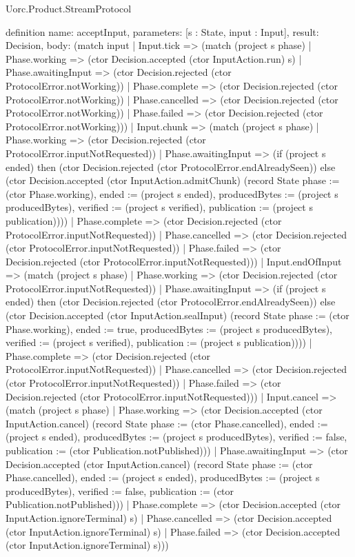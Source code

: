 \begin{lexlean}{Uorc.Product.StreamProtocol}
\begin{semanticmodule}
definition{
  name: acceptInput,
  parameters: [s : State, input : Input],
  result: Decision,
  body: (match input
    | Input.tick => (match (project s phase)
      | Phase.working => (ctor Decision.accepted (ctor InputAction.run) s)
      | Phase.awaitingInput => (ctor Decision.rejected (ctor ProtocolError.notWorking))
      | Phase.complete => (ctor Decision.rejected (ctor ProtocolError.notWorking))
      | Phase.cancelled => (ctor Decision.rejected (ctor ProtocolError.notWorking))
      | Phase.failed => (ctor Decision.rejected (ctor ProtocolError.notWorking)))
    | Input.chunk => (match (project s phase)
      | Phase.working => (ctor Decision.rejected (ctor ProtocolError.inputNotRequested))
      | Phase.awaitingInput => (if (project s ended) then (ctor Decision.rejected (ctor ProtocolError.endAlreadySeen)) else (ctor Decision.accepted (ctor InputAction.admitChunk) (record State {phase := (ctor Phase.working), ended := (project s ended), producedBytes := (project s producedBytes), verified := (project s verified), publication := (project s publication)})))
      | Phase.complete => (ctor Decision.rejected (ctor ProtocolError.inputNotRequested))
      | Phase.cancelled => (ctor Decision.rejected (ctor ProtocolError.inputNotRequested))
      | Phase.failed => (ctor Decision.rejected (ctor ProtocolError.inputNotRequested)))
    | Input.endOfInput => (match (project s phase)
      | Phase.working => (ctor Decision.rejected (ctor ProtocolError.inputNotRequested))
      | Phase.awaitingInput => (if (project s ended) then (ctor Decision.rejected (ctor ProtocolError.endAlreadySeen)) else (ctor Decision.accepted (ctor InputAction.sealInput) (record State {phase := (ctor Phase.working), ended := true, producedBytes := (project s producedBytes), verified := (project s verified), publication := (project s publication)})))
      | Phase.complete => (ctor Decision.rejected (ctor ProtocolError.inputNotRequested))
      | Phase.cancelled => (ctor Decision.rejected (ctor ProtocolError.inputNotRequested))
      | Phase.failed => (ctor Decision.rejected (ctor ProtocolError.inputNotRequested)))
    | Input.cancel => (match (project s phase)
      | Phase.working => (ctor Decision.accepted (ctor InputAction.cancel) (record State {phase := (ctor Phase.cancelled), ended := (project s ended), producedBytes := (project s producedBytes), verified := false, publication := (ctor Publication.notPublished)}))
      | Phase.awaitingInput => (ctor Decision.accepted (ctor InputAction.cancel) (record State {phase := (ctor Phase.cancelled), ended := (project s ended), producedBytes := (project s producedBytes), verified := false, publication := (ctor Publication.notPublished)}))
      | Phase.complete => (ctor Decision.accepted (ctor InputAction.ignoreTerminal) s)
      | Phase.cancelled => (ctor Decision.accepted (ctor InputAction.ignoreTerminal) s)
      | Phase.failed => (ctor Decision.accepted (ctor InputAction.ignoreTerminal) s)))
}


\end{semanticmodule}
\end{lexlean}
